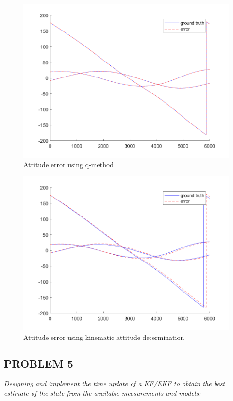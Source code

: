 \begin{figure}[H]
\centering
\includegraphics[scale=0.6]{Images/ps7_problem4_qMethod.png}
\caption{Attitude error using q-method}
\label{fig:ps7_problem4_qMethod}
\end{figure}

\begin{figure}[H]
\centering
\includegraphics[scale=0.6]{Images/ps7_problem4_kin.png}
\caption{Attitude error using kinematic attitude determination}
\label{fig:ps7_problem4_kin}
\end{figure}

\subsection{PROBLEM 5}
\textit{Designing and implement the time update of a KF/EKF to obtain the best estimate of the state from the available measurements and models:}

